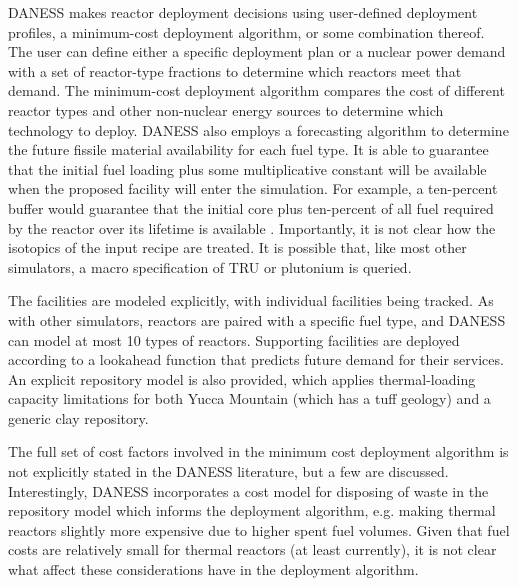 DANESS makes reactor deployment decisions using user-defined deployment
profiles, a minimum-cost deployment algorithm, or some combination thereof. The
user can define either a specific deployment plan or a nuclear power demand with
a set of reactor-type fractions to determine which reactors meet that
demand. The minimum-cost deployment algorithm compares the cost of different
reactor types and other non-nuclear energy sources to determine which technology
to deploy. DANESS also employs a forecasting algorithm to determine the future
fissile material availability for each fuel type. It is able to guarantee that
the initial fuel loading plus some multiplicative constant will be available
when the proposed facility will enter the simulation. For example, a ten-percent
buffer would guarantee that the initial core plus ten-percent of all fuel
required by the reactor over its lifetime is available
\cite{guerin_benchmark_2009}. Importantly, it is not clear how the isotopics of
the input recipe are treated. It is possible that, like most other simulators, a
macro specification of TRU or plutonium is queried.

The facilities are modeled explicitly, with individual facilities being
tracked. As with other simulators, reactors are paired with a specific fuel
type, and DANESS can model at most 10 types of reactors. Supporting facilities
are deployed according to a lookahead function that predicts future demand for
their services. An explicit repository model is also provided, which applies
thermal-loading capacity limitations for both Yucca Mountain (which has a tuff
geology) and a generic clay repository.

The full set of cost factors involved in the minimum cost deployment algorithm
is not explicitly stated in the DANESS literature, but a few are
discussed. Interestingly, DANESS incorporates a cost model for disposing of
waste in the repository model which informs the deployment algorithm,
e.g. making thermal reactors slightly more expensive due to higher spent fuel
volumes. Given that fuel costs are relatively small for thermal reactors (at
least currently), it is not clear what affect these considerations have in the
deployment algorithm.

